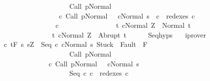 \begin{isabellebody}
\ \ \ \ \ \ \ \ \ \ \ \ \ \ \ \ \ \ \ \ {\isasymGamma}{\isasymturnstile}Call\ p{\isasymdown}Normal\ {\isasymsigma}\ {\isasymand}\isanewline
\ \ \ \ \ \ \ \ \ \ \ \ \ \ \ \ \ {\isacharparenleft}{\isasymexists}c{\isacharprime}{\isachardot}\ {\isasymGamma}{\isasymturnstile}{\isacharparenleft}Call\ p{\isacharcomma}Normal\ {\isasymsigma}{\isacharparenright}\ {\isasymrightarrow}\isactrlsup {\isacharplus}\ {\isacharparenleft}c{\isacharprime}{\isacharcomma}Normal\ s{\isacharparenright}\ {\isasymand}\ c{}\ {\isasymin}\ redexes\ c{\isacharprime}{\isacharparenright}{\isacharbraceright}\isanewline
\ \ \ \ \ \ \ \ \ \ \ \ \ \ \ \ c{}\ \isanewline
\ \ \ \ \ \ \ \ \ \ \ \ \ \ \ {\isacharbraceleft}t{\isachardot}\ {\isasymGamma}{\isasymturnstile}{\isasymlangle}c{}{\isacharcomma}Normal\ Z{\isasymrangle}\ {\isasymRightarrow}\ Normal\ t{\isacharbraceright}{\isacharcomma}\isanewline
\ \ \ \ \ \ \ \ \ \ \ \ \ \ \ {\isacharbraceleft}t{\isachardot}\ {\isasymGamma}{\isasymturnstile}{\isasymlangle}c{}{\isacharcomma}Normal\ Z{\isasymrangle}\ {\isasymRightarrow}\ Abrupt\ t{\isacharbraceright}{\isachardoublequoteclose}\isanewline
\ \ \ \ \isamarkupfalse%
\ Seq{\isachardot}hyps\ {\isacharparenleft}{}{\isacharparenright}\ \isamarkupfalse%
\ iprover\isanewline
\ \ \isamarkupfalse%
\ c{}{\isacharcolon}\ {\isachardoublequoteopen}{\isasymGamma}{\isacharcomma}{\isasymTheta}{\isasymturnstile}\isactrlsub t\isactrlbsub {\isacharslash}F\isactrlesub \ {\isacharbraceleft}s{\isachardot}\ s{\isacharequal}Z\ {\isasymand}\ {\isasymGamma}{\isasymturnstile}{\isasymlangle}Seq\ c{}\ c{}{\isacharcomma}Normal\ s{\isasymrangle}\ {\isasymRightarrow}{\isasymnotin}{\isacharparenleft}{\isacharbraceleft}Stuck{\isacharbraceright}\ {\isasymunion}\ Fault\ {\isacharbackquote}\ {\isacharparenleft}{\isacharminus}F{\isacharparenright}{\isacharparenright}\ {\isasymand}\ \isanewline
\ \ \ \ \ \ \ \ \ \ \ \ \ \ \ \ \ \ \ \ {\isasymGamma}{\isasymturnstile}Call\ p{\isasymdown}Normal\ {\isasymsigma}\ {\isasymand}\isanewline
\ \ \ \ \ \ \ \ \ \ \ \ \ \ {\isacharparenleft}{\isasymexists}c{\isacharprime}{\isachardot}\ {\isasymGamma}{\isasymturnstile}{\isacharparenleft}Call\ p{\isacharcomma}Normal\ {\isasymsigma}{\isacharparenright}\ {\isasymrightarrow}\isactrlsup {\isacharplus}\ {\isacharparenleft}c{\isacharprime}{\isacharcomma}Normal\ s{\isacharparenright}\ {\isasymand}\ \isanewline
\ \ \ \ \ \ \ \ \ \ \ \ \ \ \ \ \ \ \ \ Seq\ c{}\ c{}\ {\isasymin}\ redexes\ c{\isacharprime}{\isacharparenright}{\isacharbraceright}\isanewline

\end{isabellebody}

